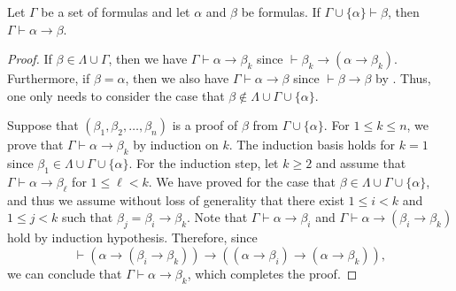 \begin{theorem}
  \label{thm:deduction}
  Let $\Gamma$ be a set of formulas and let $\alpha$ and $\beta$ be formulas.
  If $\Gamma \cup \{\alpha\} \vdash \beta$, then
  $\Gamma \vdash \alpha \to \beta$.
\end{theorem}
\begin{proof}
  If $\beta \in \Lambda \cup \Gamma$, then we have
  $\Gamma \vdash \alpha \to \beta_k$ since
  $\vdash \beta_k \to (\alpha \to \beta_k)$.
  Furthermore, if $\beta = \alpha$, then we also have
  $\Gamma \vdash \alpha \to \beta$ since $\vdash \beta \to \beta$ by
  .
  Thus, one only needs to consider the case that
  $\beta \notin \Lambda \cup \Gamma \cup \{\alpha\}$.

  Suppose that $(\beta_1, \beta_2, \dots, \beta_n)$ is a proof of $\beta$ from
  $\Gamma \cup \{\alpha\}$.
  For $1 \leq k \leq n$, we prove that $\Gamma \vdash \alpha \to \beta_k$ by
  induction on $k$.
  The induction basis holds for $k = 1$ since
  $\beta_1 \in \Lambda \cup \Gamma \cup \{\alpha\}$.
  For the induction step, let $k \geq 2$ and assume that
  $\Gamma \vdash \alpha \to \beta_\ell$ for $1 \leq \ell < k$.
  We have proved for the case that
  $\beta \in \Lambda \cup \Gamma \cup \{\alpha\}$, and thus we assume without
  loss of generality that there exist $1 \leq i < k$ and $1 \leq j < k$
  such that $\beta_j = \beta_i \to \beta_k$.
  Note that $\Gamma \vdash \alpha \to \beta_i$ and
  $\Gamma \vdash \alpha \to (\beta_i \to \beta_k)$
  hold by induction hypothesis.
  Therefore, since
  \begin{equation*}
    \vdash (\alpha \to (\beta_i \to \beta_k)) \to
    ((\alpha \to \beta_i) \to (\alpha \to \beta_k)),
  \end{equation*}
  we can conclude that $\Gamma \vdash \alpha \to \beta_k$,
  which completes the proof.
\end{proof}


